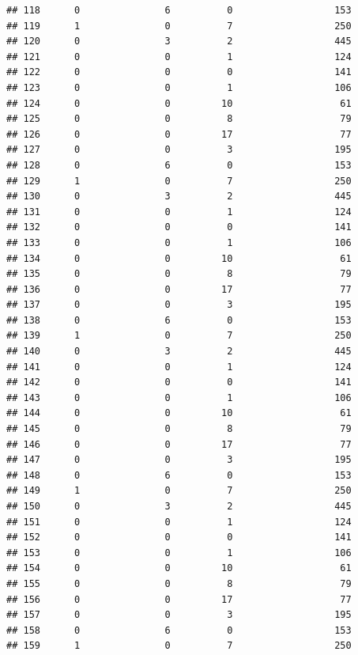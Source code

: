\documentclass[
]{article}
\begin{document}
\begin{verbatim}
## 118      0               6          0                  153
## 119      1               0          7                  250
## 120      0               3          2                  445
## 121      0               0          1                  124
## 122      0               0          0                  141
## 123      0               0          1                  106
## 124      0               0         10                   61
## 125      0               0          8                   79
## 126      0               0         17                   77
## 127      0               0          3                  195
## 128      0               6          0                  153
## 129      1               0          7                  250
## 130      0               3          2                  445
## 131      0               0          1                  124
## 132      0               0          0                  141
## 133      0               0          1                  106
## 134      0               0         10                   61
## 135      0               0          8                   79
## 136      0               0         17                   77
## 137      0               0          3                  195
## 138      0               6          0                  153
## 139      1               0          7                  250
## 140      0               3          2                  445
## 141      0               0          1                  124
## 142      0               0          0                  141
## 143      0               0          1                  106
## 144      0               0         10                   61
## 145      0               0          8                   79
## 146      0               0         17                   77
## 147      0               0          3                  195
## 148      0               6          0                  153
## 149      1               0          7                  250
## 150      0               3          2                  445
## 151      0               0          1                  124
## 152      0               0          0                  141
## 153      0               0          1                  106
## 154      0               0         10                   61
## 155      0               0          8                   79
## 156      0               0         17                   77
## 157      0               0          3                  195
## 158      0               6          0                  153
## 159      1               0          7                  250

\end{verbatim}
\end{document}
